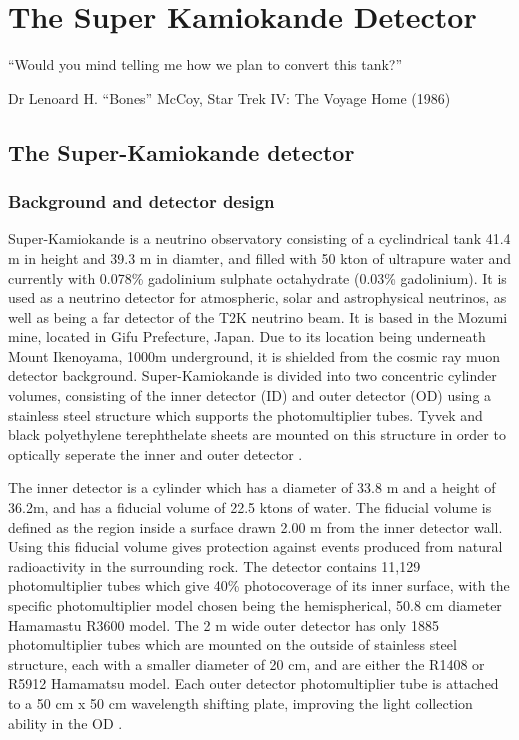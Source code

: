 \chapter{The Super Kamiokande Detector}
\epigraph{``Would you mind telling me how we plan to convert this tank?''}{Dr Lenoard H. ``Bones'' McCoy, Star Trek IV: The Voyage Home (1986)  }
\label{chp:superk}



\section{The Super-Kamiokande detector}

\subsection{Background and detector design}

Super-Kamiokande is a neutrino observatory consisting of a cyclindrical tank 41.4 m in height and 39.3 m in diamter, and filled with 50 kton of ultrapure water and currently with 0.078\% gadolinium sulphate octahydrate (0.03\% gadolinium). It is used as a neutrino detector for atmospheric, solar and astrophysical neutrinos, as well as being a far detector of the T2K neutrino beam. It is based in the Mozumi mine, located in Gifu Prefecture, Japan. Due to its location being underneath Mount Ikenoyama, 1000m underground, it is shielded from the cosmic ray muon detector background. Super-Kamiokande is divided into two concentric cylinder volumes, consisting of the inner detector (ID) and outer detector (OD) using a stainless steel structure which supports the photomultiplier tubes. Tyvek and black polyethylene terephthelate sheets are mounted on this structure in order to optically seperate the inner and outer detector \cite{suzuki_super-kamiokande_2019}.

The inner detector is a cylinder which has a diameter of 33.8 m and a height of 36.2m, and has a fiducial volume of 22.5 ktons of water. The fiducial volume is defined as the region inside a surface drawn 2.00 m from the inner detector wall. Using this fiducial volume gives protection against events produced from natural radioactivity in the surrounding rock. The detector contains 11,129 photomultiplier tubes which give 40\% photocoverage of its inner surface, with the specific photomultiplier model chosen being the hemispherical, 50.8 cm diameter Hamamastu R3600 model. The 2 m wide outer detector has only 1885 photomultiplier tubes which are mounted on the outside of stainless steel structure, each with a smaller diameter of 20 cm, and are either the R1408 or R5912 Hamamatsu model. Each outer detector photomultiplier tube is attached to a 50 cm x 50 cm wavelength shifting plate, improving the light collection ability in the OD \cite{fukuda_super-kamiokande_2003}.

